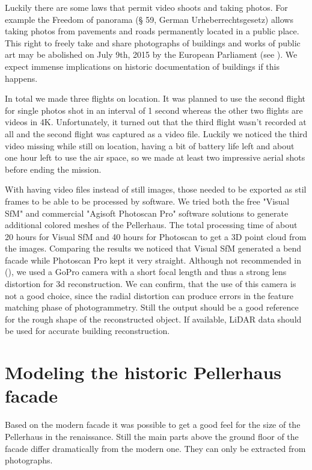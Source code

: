 Luckily there are some laws that permit video shoots and taking photos. For example the Freedom of panorama (§ 59, German Urheberrechtsgesetz) allows taking photos from pavements and roads permanently located in a public place. This right to freely take and share photographs of buildings and works of public art may be abolished on July 9th, 2015 by the European Parliament (see \parencite{freedomOfPanoramaUnderAttack}). We expect immense implications on historic documentation of buildings if this happens.

In total we made three flights on location. It was planned to use the second flight for single photos shot in an interval of 1 second whereas the other two flights are videos in 4K. Unfortunately, it turned out that the third flight wasn't recorded at all and the second flight was captured as a video file. Luckily we noticed the third video missing while still on location, having a bit of battery life left and about one hour left to use the air space, so we made at least two impressive aerial shots before ending the mission.

With having video files instead of still images, those needed to be exported as stil frames to be able to be processed by software. We tried both the free "Visual SfM" and commercial "Agisoft Photoscan Pro" software solutions to generate additional colored meshes of the Pellerhaus. The total processing time of about 20 hours for Visual SfM and 40 hours for Photoscan to get a 3D point cloud from the images. Comparing the results we noticed that Visual SfM generated a bend facade while Photoscan Pro kept it very straight. Although not recommended in (), we used a GoPro camera with a short focal length and thus a strong lens distortion for 3d reconstruction. We can confirm, that the use of this camera is not a good choice, since the radial distortion can produce errors in the feature matching phase of photogrammetry. Still the output should be a good reference for the rough shape of the reconstructed object. If available, LiDAR data should be used for accurate building reconstruction.

\section{Modeling the historic Pellerhaus facade}

Based on the modern facade it was possible to get a good feel for the size of the Pellerhaus in the renaissance. Still the main parts above the ground floor of the facade differ dramatically from the modern one. They can only be extracted from photographs.


